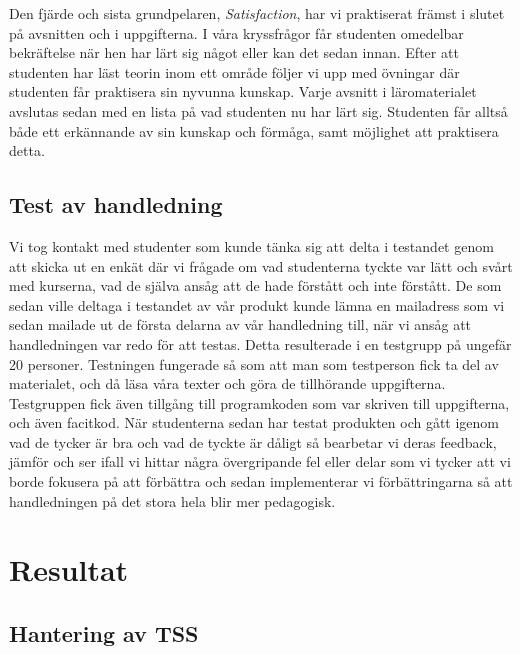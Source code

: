 \documentclass[]{article}
\begin{document}
Den fjärde och sista grundpelaren, \textit{Satisfaction}, har vi praktiserat främst i slutet på 
avsnitten och i uppgifterna. I våra kryssfrågor får studenten omedelbar bekräftelse när hen har lärt sig 
något eller kan det sedan innan. Efter att studenten har läst teorin inom ett område följer vi upp med 
övningar där studenten får praktisera sin nyvunna kunskap. Varje avsnitt i läromaterialet avslutas sedan 
med en lista på vad studenten nu har lärt sig. Studenten får alltså både ett erkännande av sin kunskap 
och förmåga, samt möjlighet att praktisera detta. 

\subsection{Test av handledning}

Vi tog kontakt med studenter som kunde tänka sig att delta i testandet genom att skicka ut en enkät där vi frågade om vad studenterna tyckte var lätt och svårt med kurserna, vad de själva ansåg att de hade förstått och inte förstått. 
De som sedan ville deltaga i testandet av vår produkt kunde lämna en mailadress som vi sedan mailade ut de första delarna av vår handledning till, när vi ansåg att handledningen var redo för att testas. 
Detta resulterade i en testgrupp på ungefär 20 personer. 
Testningen fungerade så som att man som testperson fick ta del av materialet, och då läsa våra texter och göra de tillhörande uppgifterna. Testgruppen fick även tillgång till programkoden som var skriven till uppgifterna, och även facitkod.
När studenterna sedan har testat produkten och gått igenom vad de tycker är bra och vad de tyckte är dåligt så bearbetar vi deras feedback, jämför och ser ifall vi hittar några övergripande fel eller delar som vi tycker att vi borde fokusera på att förbättra och sedan implementerar vi förbättringarna så att handledningen på det stora hela blir mer pedagogisk. 



\section{Resultat}


%

\subsection{Hantering av TSS}
\end{document}
